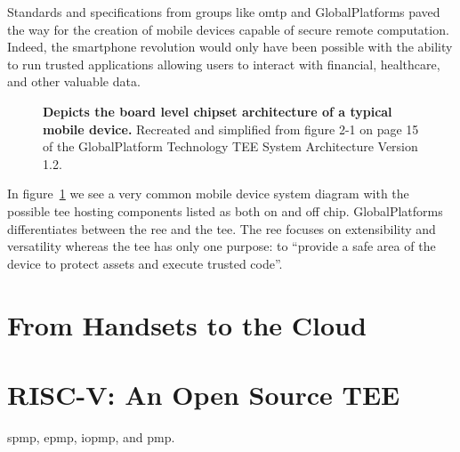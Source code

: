 \renewcommand{\arraystretch}{2}


Standards and specifications from groups like \gls{omtp} and GlobalPlatforms paved the way for the creation of mobile devices capable of secure remote computation. Indeed, the smartphone revolution would only have been possible with the ability to run trusted applications allowing users to interact with financial, healthcare, and other valuable data.

\begin{figure}[htbp]
\centering

\caption[GlobalPlatforms Typical Chipset Architecture]{\textbf{Depicts the board level chipset architecture of a typical mobile device.} Recreated and simplified from figure 2-1 on page 15 of the GlobalPlatform Technology TEE System Architecture Version 1.2. \cite{GlobalPlatform2018}}
\label{fig:gpd-tee}
\end{figure}

In figure~\ref{fig:gpd-tee} we see a very common mobile device system diagram with the possible \gls{tee} hosting components listed as both on and off chip. GlobalPlatforms differentiates between the \gls{ree} and the \gls{tee}. The \gls{ree} focuses on extensibility and versatility whereas the \gls{tee} has only one purpose: to ``provide a safe area of the device to protect assets and execute trusted code''. \cite{GlobalPlatform2018}

\section{From Handsets to the Cloud}

\section{RISC-V: An Open Source TEE}
\gls{spmp}, \gls{epmp}, \gls{iopmp}, and \gls{pmp}.


